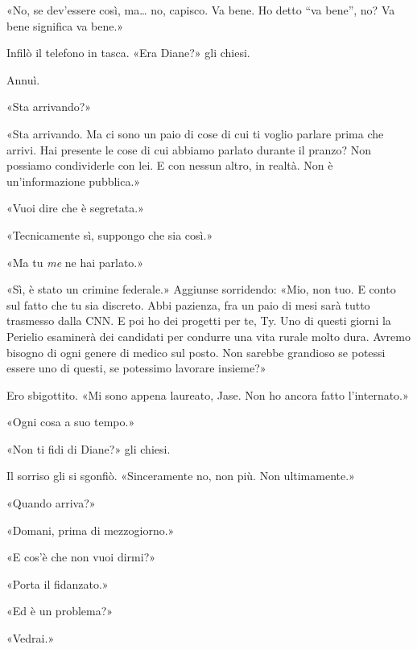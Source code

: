 «No, se dev'essere così, ma\ldots{} no, capisco. Va bene. Ho detto ``va
bene'', no? Va bene significa va bene.»

Infilò il telefono in tasca. «Era Diane?» gli chiesi.

Annuì.

«Sta arrivando?»

«Sta arrivando. Ma ci sono un paio di cose di cui ti voglio parlare
prima che arrivi. Hai presente le cose di cui abbiamo parlato durante il
pranzo? Non possiamo condividerle con lei. E con nessun altro, in
realtà. Non è un'informazione pubblica.»

«Vuoi dire che è segretata.»

«Tecnicamente sì, suppongo che sia così.»

«Ma tu \emph{me} ne hai parlato.»

«Sì, è stato un crimine federale.» Aggiunse sorridendo: «Mio, non tuo. E
conto sul fatto che tu sia discreto. Abbi pazienza, fra un paio di mesi
sarà tutto trasmesso dalla CNN. E poi ho dei progetti per te, Ty. Uno di
questi giorni la Perielio esaminerà dei candidati per condurre una vita
rurale molto dura. Avremo bisogno di ogni genere di medico sul posto.
Non sarebbe grandioso se potessi essere uno di questi, se potessimo
lavorare insieme?»

Ero sbigottito. «Mi sono appena laureato, Jase. Non ho ancora fatto
l'internato.»

«Ogni cosa a suo tempo.»

«Non ti fidi di Diane?» gli chiesi.

Il sorriso gli si sgonfiò. «Sinceramente no, non più. Non ultimamente.»

«Quando arriva?»

«Domani, prima di mezzogiorno.»

«E cos'è che non vuoi dirmi?»

«Porta il fidanzato.»

«Ed è un problema?»

«Vedrai.»